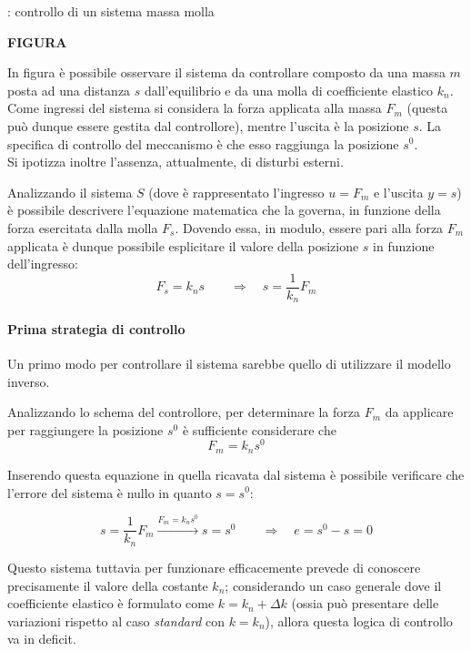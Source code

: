	\begin{esempio}{: controllo di un sistema massa molla}
		
		\textbf{FIGURA}
		
		In figura è possibile osservare il sistema da controllare composto da una massa $m$ posta ad una distanza $s$ dall'equilibrio e da una molla di coefficiente elastico $k_n$. Come ingressi del sistema si considera la forza applicata alla massa $F_m$ (questa può dunque essere gestita dal controllore), mentre l'uscita è la posizione $s$. La specifica di controllo del meccanismo è che esso raggiunga la posizione $s^0$. \\ Si ipotizza inoltre l'assenza, attualmente, di disturbi esterni.
		
		\begin{center}
		\end{center}
		
		Analizzando il sistema $S$ (dove è rappresentato l'ingresso $u=F_m$ e l'uscita $y = s$) è possibile descrivere l'equazione matematica che la governa, in funzione della forza esercitata dalla molla $F_s$. Dovendo essa, in modulo, essere pari alla forza $F_m$ applicata è dunque possibile esplicitare il valore della posizione $s$ in funzione dell'ingresso:
		\[ F_s = k_n s \qquad \Rightarrow \quad s =\frac{1}{k_n} F_m	 \]
				
		\paragraph{Prima strategia di controllo} Un primo modo per controllare il sistema sarebbe quello di utilizzare il modello inverso.
		
		\begin{center}
		\end{center}
		
		Analizzando lo schema del controllore, per determinare la forza $F_m$ da applicare per raggiungere la posizione $s^0$ è sufficiente considerare che
		\[ F_m = k_n s^0\]
		
		Inserendo questa equazione in quella ricavata dal sistema è possibile verificare che l'errore del sistema è nullo in quanto $s=s^0$:
		
		\[ s = \frac 1 {k_n}F_m \xrightarrow{F_m = k_n s^0} s = s^0 \qquad \Rightarrow \quad e = s^0 - s = 0\]
		
		Questo sistema tuttavia per funzionare efficacemente prevede di conoscere precisamente il valore della costante $k_n$; considerando un caso generale dove il coefficiente elastico è formulato come $k = k_n+\Delta k$ (ossia può presentare delle variazioni rispetto al caso \textit{standard} con $k = k_n$), allora questa logica di controllo va in deficit. 
		

\end{esempio}
